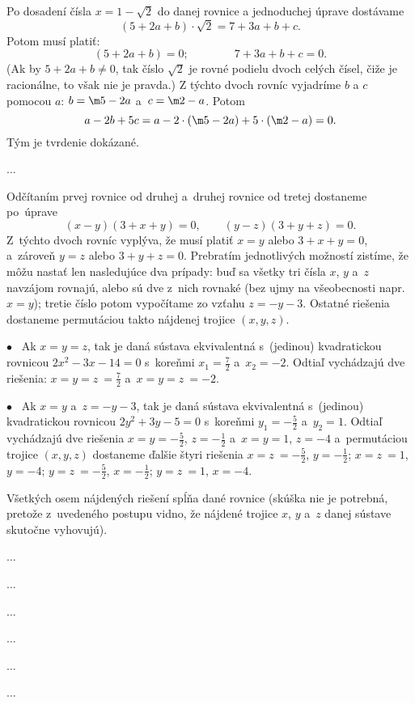{%
Po dosadení čísla $x=1 - \sqrt 2$ do danej rovnice a jednoduchej úprave
dostávame
$$(5 + 2a + b) \cdot \sqrt 2 = 7 + 3a + b + c .$$
Potom musí platiť:
$$(5 + 2a + b) =  0; \qquad \qquad 7 + 3a + b + c = 0.$$
(Ak by $5+2a+b\ne 0$, tak číslo $\sqrt 2$ je rovné podielu dvoch celých
čísel, čiže je racionálne, to však nie je pravda.)
Z týchto dvoch rovníc vyjadríme $b$ a $c$ pomocou $a$:
$b=\m 5 - 2a$ a~$c=\m 2 - a$. Potom
$$a-2b+ 5c = a - 2\cdot(\m 5 - 2a) + 5\cdot(\m 2 - a) = 0 .$$
Tým je tvrdenie dokázané.
}

{%
...}

{%
Odčítaním prvej rovnice od druhej a~druhej rovnice od tretej dostaneme
po~úprave
$$
(x-y)(3+x+y) = 0, \qquad
(y-z)(3+y+z) = 0 .
$$
Z~týchto dvoch rovníc vyplýva, že musí platiť $x = y$ alebo $3+x+y =
0$, a~zároveň $y = z$ alebo $3+y+z = 0$. Prebratím jednotlivých
možností zistíme, že môžu nastať len nasledujúce dva prípady:
buď sa všetky tri čísla $x$, $y$ a~$z$ navzájom rovnajú, alebo
sú dve z~nich rovnaké (bez ujmy na všeobecnosti napr.~$x=y$); tretie
číslo potom vypočítame zo vzťahu $z={-y}-3$. Ostatné riešenia dostaneme
permutáciou takto nájdenej trojice $(x,y,z)$.

$\bullet$~
Ak $x = y = z$, tak je daná sústava ekvivalentná s~(jedinou)
kvadratickou rovnicou $2x^2-3x-14=0$ s~koreňmi $x_1=\frac 72$
a~$x_2={-2}$. Odtiaľ vychádzajú dve riešenia: $x = y = z~= \frac 72$
a~$x = y = z~= {-2} $.

$\bullet$~
Ak $x = y$ a~$z = {-y}- 3$, tak je daná sústava ekvivalentná s~(jedinou)
kvadratickou rovnicou $2y^2+3y-5=0$ s~koreňmi $y_1={-\frac52}$ a~$y_2=1$.
Odtiaľ vychádzajú dve riešenia
$x = y = {-\frac 52}$, $z = {-\frac 12}$
a~$x = y = 1$, $z = {-4} $ a~permutáciou trojice $(x,y,z)$
dostaneme ďalšie štyri riešenia
$x = z~= {-\frac 52}$, $y = {-\frac 12}$;
$x = z~= 1$, $y = {-4}$;
$y = z~= {-\frac 52}$, $x = {-\frac 12}$;
$y = z~= 1$, $x = {-4}$.

Všetkých osem nájdených riešení spĺňa dané rovnice (skúška nie je
potrebná, pretože z~uvedeného postupu vidno, že nájdené trojice
$x$, $y$ a~$z$ danej sústave skutočne vyhovujú).
}

{%
...}

{%
...}

{%
...}

{%
...}

{%
...}

{%
...}

